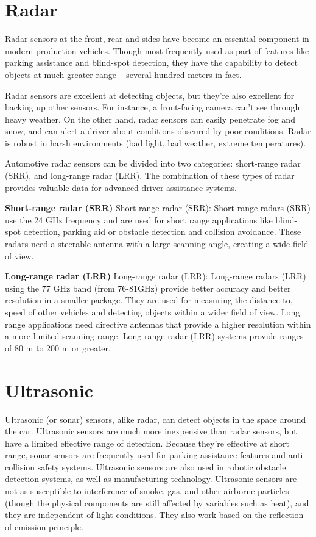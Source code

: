 \section{Radar}

Radar sensors at the front, rear and sides have become an essential component in
modern production vehicles. Though most frequently used as part of features like
parking assistance and blind-spot detection, they have the capability to detect
objects at much greater range – several hundred meters in fact.

Radar sensors are excellent at detecting objects, but they’re also excellent for
backing up other sensors. For instance, a front-facing camera can’t see through
heavy weather. On the other hand, radar sensors can easily penetrate fog and
snow, and can alert a driver about conditions obscured by poor conditions. Radar
is robust in harsh environments (bad light, bad weather, extreme temperatures).

Automotive radar sensors can be divided into two categories: short-range radar
(SRR), and long-range radar (LRR). The combination of these types of radar
provides valuable data for advanced driver assistance systems.

\textbf{Short-range radar (SRR)}
Short-range radar (SRR): Short-range radars (SRR) use the 24 GHz frequency and
are used for short range applications like blind-spot detection, parking aid or
obstacle detection and collision avoidance. These radars need a steerable
antenna with a large scanning angle, creating a wide field of view. 


\textbf{Long-range radar (LRR)}
Long-range radar (LRR): Long-range radars (LRR) using the 77 GHz band (from
76-81GHz) provide better accuracy and better resolution in a smaller package.
They are used for measuring the distance to, speed of other vehicles and
detecting objects within a wider field of view. Long range applications need directive antennas that provide a higher
resolution within a more limited scanning range. Long-range radar (LRR) systems
provide ranges of 80 m to 200 m or greater.

\section{Ultrasonic}

Ultrasonic (or sonar) sensors, alike radar, can detect objects in the space
around the car. Ultrasonic sensors are much more inexpensive than radar sensors,
but have a limited effective range of detection. Because they’re effective at
short range, sonar sensors are frequently used for parking assistance features
and anti-collision safety systems. Ultrasonic sensors are also used in robotic
obstacle detection systems, as well as manufacturing technology. Ultrasonic
sensors are not as susceptible to interference of smoke, gas, and other airborne
particles (though the physical components are still affected by variables such
as heat), and they are independent of light conditions. They also work based on
the reflection of emission principle. 

